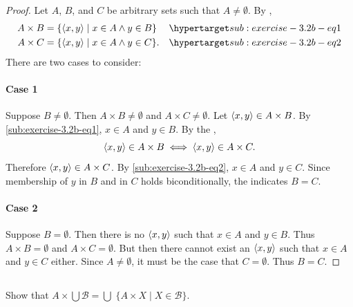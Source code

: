 \documentclass{report}
\begin{document}
  \begin{proof}
    Let $A$, $B$, and $C$ be arbitrary sets such that $A \neq \emptyset$.
    By ,
      \begin{align}
        A \times B & = \{ \tuple{x, y} \mid x \in A \land y \in B \}
          & \hyperlabel{sub:exercise-3.2b-eq1} \\
        A \times C & = \{ \tuple{x, y} \mid x \in A \land y \in C \}.
          & \hyperlabel{sub:exercise-3.2b-eq2}
      \end{align}
    There are two cases to consider:

    \paragraph{Case 1}%

      Suppose $B \neq \emptyset$.
      Then $A \times B \neq \emptyset$ and $A \times C \neq \emptyset$.
      Let $\left< x, y \right> \in A \times B$.
      By \eqref{sub:exercise-3.2b-eq1}, $x \in A$ and $y \in B$.
      By the ,
        $$\left< x, y \right> \in A \times B \iff \left< x, y \right> \in A \times C.$$
      Therefore $\left< x, y \right> \in A \times C$.
      By \eqref{sub:exercise-3.2b-eq2}, $x \in A$ and $y \in C$.
      Since membership of $y$ in $B$ and in $C$ holds biconditionally, the
         indicates $B = C$.

    \paragraph{Case 2}%

      Suppose $B = \emptyset$.
      Then there is no $\left< x, y \right>$ such that $x \in A$ and $y \in B$.
      Thus $A \times B = \emptyset$ and $A \times C = \emptyset$.
      But then there cannot exist an $\left< x, y \right>$ such that $x \in A$
        and $y \in C$ either.
      Since $A \neq \emptyset$, it must be the case that $C = \emptyset$.
      Thus $B = C$.

  \end{proof}

\subsection{}%

  Show that $A \times \bigcup \mathscr{B} =
    \bigcup\;\{ A \times X \mid X \in \mathscr{B} \}$.
\end{document}
